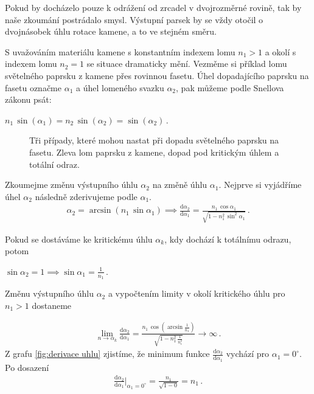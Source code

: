 Pokud by docházelo pouze k odrážení od zrcadel v dvojrozměrné rovině, tak by naše zkoumání postrádalo smysl. Výstupní parsek by se vždy otočil o dvojnásobek úhlu rotace kamene, a to ve stejném směru. 

S uvažováním materiálu kamene s konstantním indexem lomu $ n_1>1 $ a okolí s indexem lomu $ n_2 = 1 $ se situace dramaticky mění. Vezměme si příklad lomu světelného paprsku z kamene přes rovinnou fasetu. Úhel dopadajícího paprsku na fasetu označme $\alpha_1$ a úhel lomeného svazku $\alpha_2$, pak můžeme podle Snellova zákonu psát:

\begin{center}
$n_1\,\sin(\alpha_1) = n_2\,\sin(\alpha_2) = \sin(\alpha_2)\,.$
\end{center}

\begin{figure}[h!]
\begin{center}
\scalebox{.9}{ }
\end{center}
\caption{Tři případy, které mohou nastat při dopadu světelného paprsku na fasetu. Zleva lom paprsku z kamene, dopad pod kritickým úhlem a totální odraz.}
\label{fig:lom ven }
\end{figure}

Zkoumejme změnu výstupního úhlu $\alpha_2$ na změně úhlu $\alpha_1$. Nejprve si vyjádříme úhel $\alpha_2$ následně zderivujeme podle $\alpha_1$. 
\begin{eqnarray}
\alpha_2 = \arcsin(n_1\,\sin\alpha_1) \implies \frac{\mathrm{d}\alpha_2}{\mathrm{d}\alpha_1}= \frac{n_1\,\cos\alpha_1}{\sqrt{1-n_1^2\,\sin^2\alpha_1}}\,.
\label{eq:derivace uhlu}  
\end{eqnarray}

Pokud se dostáváme ke kritickému úhlu $\alpha_k$, kdy dochází k totálnímu odrazu, potom
\begin{center}
 $	\sin\alpha_2 = 1 \implies \sin\alpha_1 = \frac{1}{n_1}\,. $
\end{center}

Změnu výstupního úhlu $\alpha_2$ a vypočtením limity v okolí kritického úhlu pro $ n_1>1$ dostaneme 

\begin{eqnarray}
\lim_{n \to \alpha_k}\frac{\mathrm{d}\alpha_2}{\mathrm{d}\alpha_1} = \frac{n_1\,\cos(\arcsin\frac{1}{n_1})}{\sqrt{1-n_1^2\,\frac{1}{n_1^2}}} \to \infty\,.
\label{eq:zmena velikosti posunu}  
\end{eqnarray}
Z grafu \ref{fig:derivace uhlu} zjistíme, že minimum funkce $\frac{\mathrm{d}\alpha_2}{\mathrm{d}\alpha_1}$ vychází pro $ \alpha_1 = 0^\circ $. Po dosazení
\begin{eqnarray}
{\frac{\mathrm{d}\alpha_2}{\mathrm{d}\alpha_1}}\biggr\rvert_{\alpha_1 = 0^\circ}= \frac{n_1}{\sqrt{1-0}} = n_1\,.
\end{eqnarray}


